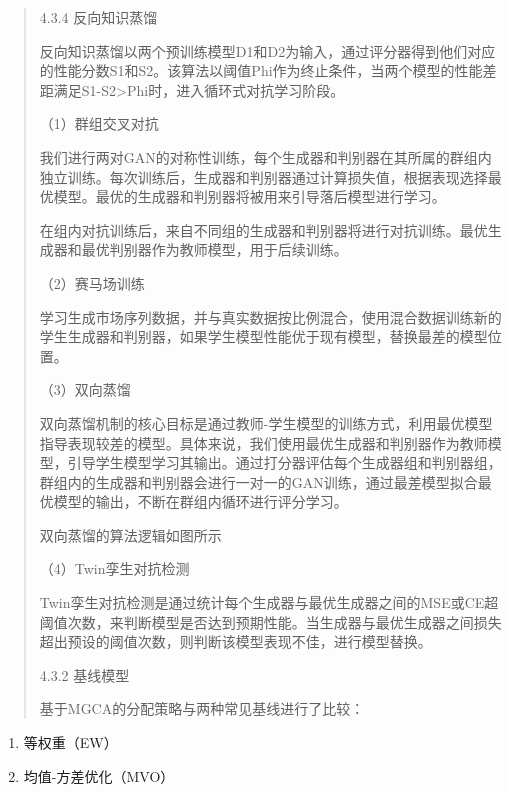 \begin{quote}
4.3.4 反向知识蒸馏

反向知识蒸馏以两个预训练模型D1和D2为输入，通过评分器得到他们对应的性能分数S1和S2。该算法以阈值Phi作为终止条件，当两个模型的性能差距满足\textbar S1-S2\textbar\textgreater Phi时，进入循环式对抗学习阶段。


（1）群组交叉对抗

我们进行两对GAN的对称性训练，每个生成器和判别器在其所属的群组内独立训练。每次训练后，生成器和判别器通过计算损失值，根据表现选择最优模型。最优的生成器和判别器将被用来引导落后模型进行学习。

在组内对抗训练后，来自不同组的生成器和判别器将进行对抗训练。最优生成器和最优判别器作为教师模型，用于后续训练。

（2）赛马场训练

学习生成市场序列数据，并与真实数据按比例混合，使用混合数据训练新的学生生成器和判别器，如果学生模型性能优于现有模型，替换最差的模型位置。

（3）双向蒸馏

双向蒸馏机制的核心目标是通过教师-学生模型的训练方式，利用最优模型指导表现较差的模型。具体来说，我们使用最优生成器和判别器作为教师模型，引导学生模型学习其输出。通过打分器评估每个生成器组和判别器组，群组内的生成器和判别器会进行一对一的GAN训练，通过最差模型拟合最优模型的输出，不断在群组内循环进行评分学习。

双向蒸馏的算法逻辑如图所示

（4）Twin孪生对抗检测

Twin孪生对抗检测是通过统计每个生成器与最优生成器之间的MSE或CE超阈值次数，来判断模型是否达到预期性能。当生成器与最优生成器之间损失超出预设的阈值次数，则判断该模型表现不佳，进行模型替换。

4.3.2 基线模型

基于MGCA的分配策略与两种常见基线进行了比较：
\end{quote}

\begin{enumerate}
\def\labelenumi{\arabic{enumi}.}
\item
  等权重（EW）
\item
  均值-方差优化（MVO）
\end{enumerate}

